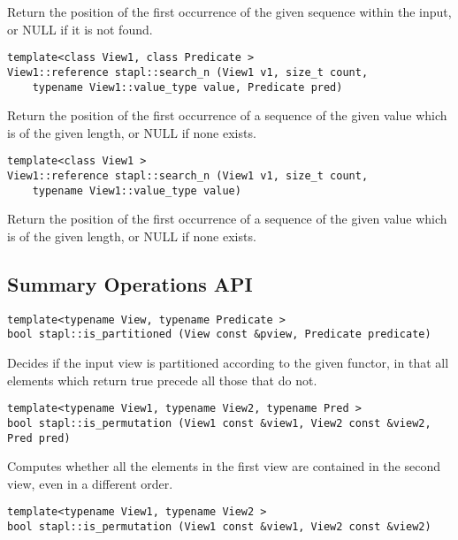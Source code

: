 Return the position of the first occurrence of the given sequence within the input, or NULL if it is not found.

\begin{verbatim}
template<class View1, class Predicate >
View1::reference stapl::search_n (View1 v1, size_t count,
    typename View1::value_type value, Predicate pred)
\end{verbatim}

Return the position of the first occurrence of a sequence of the given value which is of the given length, or NULL if none exists.

\begin{verbatim}
template<class View1 >
View1::reference stapl::search_n (View1 v1, size_t count,
    typename View1::value_type value)
\end{verbatim}

Return the position of the first occurrence of a sequence of the given value which is of the given length, or NULL if none exists.


\subsection{Summary Operations API} \label{sec-sumry-alg}

\begin{verbatim}
template<typename View, typename Predicate >
bool stapl::is_partitioned (View const &pview, Predicate predicate)
\end{verbatim}

Decides if the input view is partitioned according to the given functor, in that all elements which return true precede all those that do not.

\begin{verbatim}
template<typename View1, typename View2, typename Pred >
bool stapl::is_permutation (View1 const &view1, View2 const &view2, Pred pred)
\end{verbatim}

Computes whether all the elements in the first view are contained in the second view, even in a different order.

\begin{verbatim}
template<typename View1, typename View2 >
bool stapl::is_permutation (View1 const &view1, View2 const &view2)
\end{verbatim}

